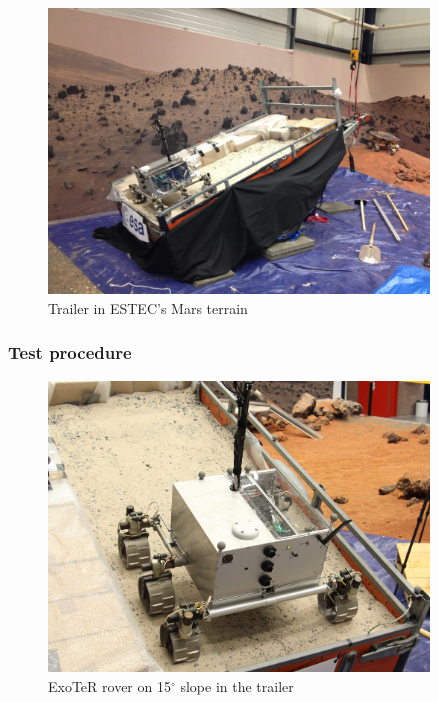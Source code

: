 \documentclass[a4paper,twocolumn]{esapub2005} %
\begin{document}



\begin{figure}[h!]
	\centering		\includegraphics[width=0.9\textwidth]{trailersetup.JPG}	
	\caption{Trailer in ESTEC's Mars terrain}
	\label{fig:trailer}
\end{figure}


\subsubsection{Test procedure}



\begin{figure}[h!]
	\centering		\includegraphics[width=0.9\textwidth]{Exoslope.JPG}	
	\caption{ExoTeR rover on 15$^{\circ}$ slope in the trailer}
	\label{fig:Exoslope}
\end{figure}
\end{document}
